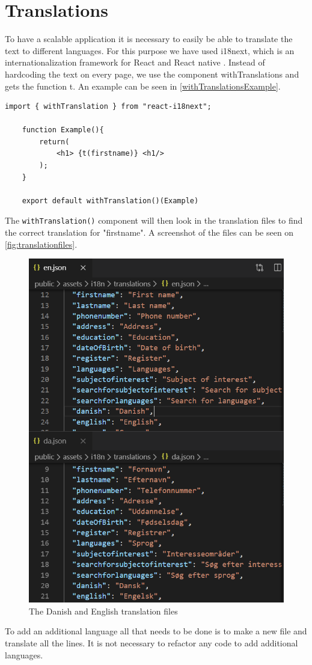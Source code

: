 \section{Translations}
To have a scalable application it is necessary to easily be able to translate the text to different languages.
For this purpose we have used i18next, which is an internationalization framework for React and React native \cite{react-i18next}.
Instead of hardcoding the text on every page, we use the component withTranslations and gets the function t.  
An example can be seen in \autoref{withTranslationsExample}. 

\begin{lstlisting}[caption={Example of withTranslation in use}, captionpos=b, label={withTranslationsExample}]
    import { withTranslation } from "react-i18next";

    function Example(){
        return(
            <h1> {t(firstname)} <h1/>
        );
    }

    export default withTranslation()(Example)
\end{lstlisting}
\noindent
The \texttt{withTranslation()} component will then look in the translation files to find the correct translation for "firstname". 
A screenshot of the files can be seen on \autoref{fig:translationfiles}.
\begin{figure}
    \centering
    \includegraphics[scale=0.5]{figures/translations.PNG}
    \caption{The Danish and English translation files}
    \label{fig:translationfiles}
\end{figure}
\noindent
To add an additional language all that needs to be done is to make a new file and translate all the lines. 
It is not necessary to refactor any code to add additional languages.